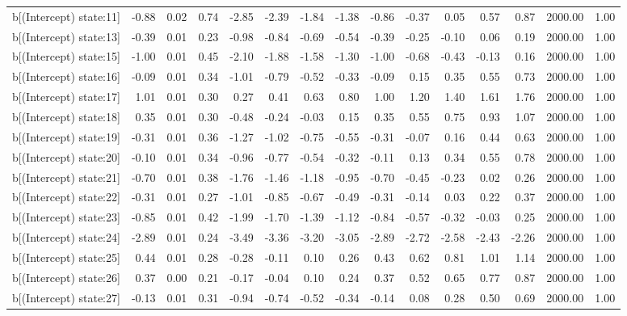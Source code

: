 \begin{table}[ht]
\begin{tabular}{rrrrrrrrrrrrrrr}
  b[(Intercept) state:11] & -0.88 & 0.02 & 0.74 & -2.85 & -2.39 & -1.84 & -1.38 & -0.86 & -0.37 & 0.05 & 0.57 & 0.87 & 2000.00 & 1.00 \\ 
  b[(Intercept) state:13] & -0.39 & 0.01 & 0.23 & -0.98 & -0.84 & -0.69 & -0.54 & -0.39 & -0.25 & -0.10 & 0.06 & 0.19 & 2000.00 & 1.00 \\ 
  b[(Intercept) state:15] & -1.00 & 0.01 & 0.45 & -2.10 & -1.88 & -1.58 & -1.30 & -1.00 & -0.68 & -0.43 & -0.13 & 0.16 & 2000.00 & 1.00 \\ 
  b[(Intercept) state:16] & -0.09 & 0.01 & 0.34 & -1.01 & -0.79 & -0.52 & -0.33 & -0.09 & 0.15 & 0.35 & 0.55 & 0.73 & 2000.00 & 1.00 \\ 
  b[(Intercept) state:17] & 1.01 & 0.01 & 0.30 & 0.27 & 0.41 & 0.63 & 0.80 & 1.00 & 1.20 & 1.40 & 1.61 & 1.76 & 2000.00 & 1.00 \\ 
  b[(Intercept) state:18] & 0.35 & 0.01 & 0.30 & -0.48 & -0.24 & -0.03 & 0.15 & 0.35 & 0.55 & 0.75 & 0.93 & 1.07 & 2000.00 & 1.00 \\ 
  b[(Intercept) state:19] & -0.31 & 0.01 & 0.36 & -1.27 & -1.02 & -0.75 & -0.55 & -0.31 & -0.07 & 0.16 & 0.44 & 0.63 & 2000.00 & 1.00 \\ 
  b[(Intercept) state:20] & -0.10 & 0.01 & 0.34 & -0.96 & -0.77 & -0.54 & -0.32 & -0.11 & 0.13 & 0.34 & 0.55 & 0.78 & 2000.00 & 1.00 \\ 
  b[(Intercept) state:21] & -0.70 & 0.01 & 0.38 & -1.76 & -1.46 & -1.18 & -0.95 & -0.70 & -0.45 & -0.23 & 0.02 & 0.26 & 2000.00 & 1.00 \\ 
  b[(Intercept) state:22] & -0.31 & 0.01 & 0.27 & -1.01 & -0.85 & -0.67 & -0.49 & -0.31 & -0.14 & 0.03 & 0.22 & 0.37 & 2000.00 & 1.00 \\ 
  b[(Intercept) state:23] & -0.85 & 0.01 & 0.42 & -1.99 & -1.70 & -1.39 & -1.12 & -0.84 & -0.57 & -0.32 & -0.03 & 0.25 & 2000.00 & 1.00 \\ 
  b[(Intercept) state:24] & -2.89 & 0.01 & 0.24 & -3.49 & -3.36 & -3.20 & -3.05 & -2.89 & -2.72 & -2.58 & -2.43 & -2.26 & 2000.00 & 1.00 \\ 
  b[(Intercept) state:25] & 0.44 & 0.01 & 0.28 & -0.28 & -0.11 & 0.10 & 0.26 & 0.43 & 0.62 & 0.81 & 1.01 & 1.14 & 2000.00 & 1.00 \\ 
  b[(Intercept) state:26] & 0.37 & 0.00 & 0.21 & -0.17 & -0.04 & 0.10 & 0.24 & 0.37 & 0.52 & 0.65 & 0.77 & 0.87 & 2000.00 & 1.00 \\ 
  b[(Intercept) state:27] & -0.13 & 0.01 & 0.31 & -0.94 & -0.74 & -0.52 & -0.34 & -0.14 & 0.08 & 0.28 & 0.50 & 0.69 & 2000.00 & 1.00 \\ 

\end{tabular}
\end{table}
